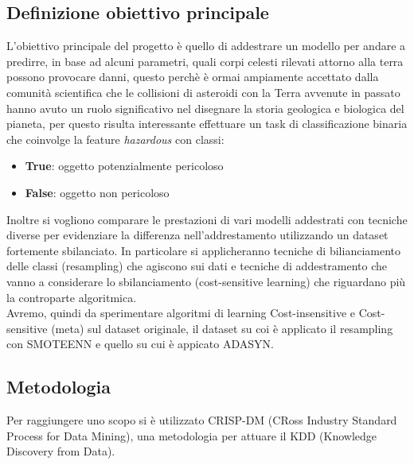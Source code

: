 \documentclass[italian,12pt,a4paper]{article}
\begin{document}
	\subsection{Definizione obiettivo principale}
	L'obiettivo principale del progetto è quello di addestrare un modello per andare a predirre, in base ad alcuni parametri, quali corpi celesti rilevati attorno alla terra possono provocare danni, questo perchè è ormai ampiamente accettato dalla comunità scientifica che le collisioni di asteroidi con la Terra avvenute in passato hanno avuto un ruolo significativo nel disegnare la storia geologica e biologica del pianeta, per questo risulta interessante effettuare un task di classificazione binaria che coinvolge la feature \textit{hazardous} con classi:
	\begin{itemize}
		\item \textbf{True}: oggetto potenzialmente pericoloso
		\item \textbf{False}: oggetto non pericoloso
	\end{itemize}
	Inoltre si vogliono comparare le prestazioni di vari modelli addestrati con tecniche diverse per evidenziare la differenza nell'addrestamento utilizzando un dataset fortemente sbilanciato.
	In particolare si applicheranno tecniche di bilianciamento delle classi (resampling) che agiscono sui dati e tecniche di addestramento che vanno a considerare lo sbilanciamento (cost-sensitive learning) che riguardano più la controparte algoritmica. \\
	Avremo, quindi da sperimentare algoritmi di learning Cost-insensitive e Cost-sensitive (meta) sul dataset originale, il dataset su coi è applicato il resampling con SMOTEENN e quello su cui è appicato ADASYN.
	
	\subsection{Metodologia}
	
	Per raggiungere uno scopo si è utilizzato CRISP-DM (CRoss Industry Standard Process for Data Mining), una metodologia per attuare il KDD (Knowledge Discovery from Data).
	
\end{document}
